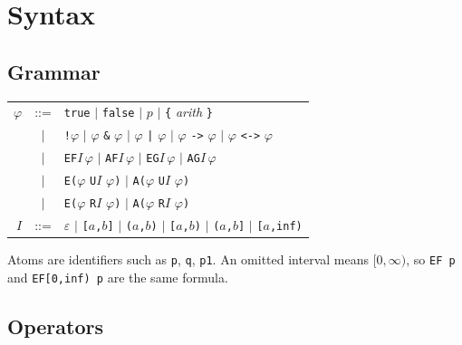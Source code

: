 \section{Syntax}\label{sec:syntax}

\subsection{Grammar}

\begin{center}
\begin{tabular}{rcl}
$\varphi$ &::=& \texttt{true} $\mid$ \texttt{false} $\mid$ $p$
              $\mid$ \texttt{\{} \textit{arith} \texttt{\}} \\
          &$\mid$& \texttt{!}$\varphi$ $\mid$ $\varphi$ \texttt{\&} $\varphi$
              $\mid$ $\varphi$ \texttt{|} $\varphi$
              $\mid$ $\varphi$ \texttt{->} $\varphi$
              $\mid$ $\varphi$ \texttt{<->} $\varphi$ \\
          &$\mid$& \texttt{EF}$I\,\varphi$ $\mid$ \texttt{AF}$I\,\varphi$
              $\mid$ \texttt{EG}$I\,\varphi$ $\mid$ \texttt{AG}$I\,\varphi$ \\
          &$\mid$& \texttt{E(}$\varphi$ \texttt{U}$I$ $\varphi$\texttt{)}
              $\mid$ \texttt{A(}$\varphi$ \texttt{U}$I$ $\varphi$\texttt{)} \\
          &$\mid$& \texttt{E(}$\varphi$ \texttt{R}$I$ $\varphi$\texttt{)}
              $\mid$ \texttt{A(}$\varphi$ \texttt{R}$I$ $\varphi$\texttt{)} \\[4pt]
$I$       &::=& $\varepsilon$ $\mid$ \texttt{[}$a$\texttt{,}$b$\texttt{]}
              $\mid$ \texttt{(}$a$\texttt{,}$b$\texttt{)}
              $\mid$ \texttt{[}$a$\texttt{,}$b$\texttt{)}
              $\mid$ \texttt{(}$a$\texttt{,}$b$\texttt{]}
              $\mid$ \texttt{[}$a$\texttt{,inf)} \\
\end{tabular}
\end{center}

\noindent
Atoms are identifiers such as \texttt{p}, \texttt{q}, \texttt{p1}.  An omitted
interval means $[0,\infty)$, so \texttt{EF p} and \texttt{EF[0,inf) p} are the
same formula.

\subsection{Operators}

